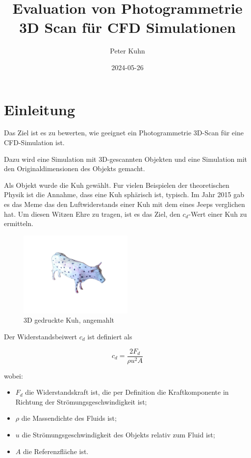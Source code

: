\documentclass[a4paper,12pt]{article}
\title{Evaluation von Photogrammetrie 3D Scan für CFD Simulationen}
\author{Peter Kuhn}
\date{2024-05-26}
\begin{document}
\maketitle

\tableofcontents

\section{Einleitung}\label{sec:Einleitung}
Das Ziel ist es zu bewerten, wie geeignet ein Photogrammetrie 3D-Scan für eine CFD-Simulation ist.

Dazu wird eine Simulation mit 3D-gescannten Objekten und eine Simulation mit den Originaldimensionen des Objekts gemacht.

Als Objekt wurde die Kuh gewählt. Fur vielen Beispielen der theoretischen Physik ist die Annahme, dass eine Kuh sphärisch ist, typisch. Im Jahr 2015 gab es das Meme das den Luftwiderstands einer Kuh mit dem eines Jeeps verglichen hat. Um diesen Witzen Ehre zu tragen, ist es das Ziel, den \( c_d \)-Wert einer Kuh zu ermitteln.

\newpage

\begin{figure}[h]
    \centering
    \includegraphics[width=0.5\textwidth]{signal-2024-05-26-124612.png}
    \caption{3D gedruckte Kuh, angemahlt}
    \label{fig:cowObj}
\end{figure}



Der Widerstandsbeiwert \( c_d \) ist definiert als

\begin{equation}
c_d = \frac{2 F_d}{\rho u^2 A}
\end{equation}

wobei:
\begin{itemize}
    \item \( F_d \) die Widerstandskraft ist, die per Definition die Kraftkomponente in Richtung der Strömungsgeschwindigkeit ist;
    \item \( \rho \) die Massendichte des Fluids ist;
    \item \( u \) die Strömungsgeschwindigkeit des Objekts relativ zum Fluid ist;
    \item \( A \) die Referenzfläche ist.
\end{itemize}
\end{document}

